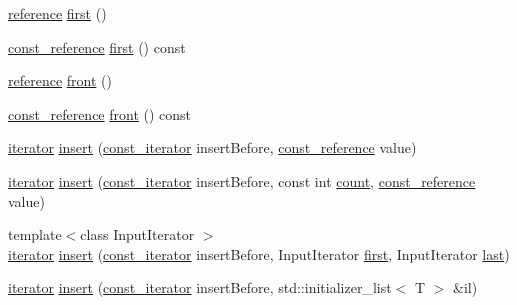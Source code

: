 \begin{DoxyCompactItemize}
\item 
\hyperlink{classprism_1_1_list_a87113fe9cf2580e395e3d9f2962f4e81}{reference} \hyperlink{classprism_1_1_list_a403997c37906888fb96e612557fc7a05}{first} ()
\item 
\hyperlink{classprism_1_1_list_aa263682b12cb5ca200c1b30f85fac524}{const\+\_\+reference} \hyperlink{classprism_1_1_list_a40d014004df46b9997ce81bbc490dac0}{first} () const 
\item 
\hyperlink{classprism_1_1_list_a87113fe9cf2580e395e3d9f2962f4e81}{reference} \hyperlink{classprism_1_1_list_a389a92c786597aa0fc0918189491cd64}{front} ()
\item 
\hyperlink{classprism_1_1_list_aa263682b12cb5ca200c1b30f85fac524}{const\+\_\+reference} \hyperlink{classprism_1_1_list_a3082476c9130719533c961b46e09762d}{front} () const 
\item 
\hyperlink{classprism_1_1_list_a32f6b5634a5aabc496ccb652eb22c490}{iterator} \hyperlink{classprism_1_1_list_a313a60ae219854247f2dfa464ac30b8e}{insert} (\hyperlink{classprism_1_1_list_aafd1fe9c849b0369c3bf7bb0d456e0a3}{const\+\_\+iterator} insert\+Before, \hyperlink{classprism_1_1_list_aa263682b12cb5ca200c1b30f85fac524}{const\+\_\+reference} value)
\item 
\hyperlink{classprism_1_1_list_a32f6b5634a5aabc496ccb652eb22c490}{iterator} \hyperlink{classprism_1_1_list_ab92c8e2076807ea6ecc2fce099e6a3e7}{insert} (\hyperlink{classprism_1_1_list_aafd1fe9c849b0369c3bf7bb0d456e0a3}{const\+\_\+iterator} insert\+Before, const int \hyperlink{classprism_1_1_list_a7dbdab274aecfdc26b7d208f80772a78}{count}, \hyperlink{classprism_1_1_list_aa263682b12cb5ca200c1b30f85fac524}{const\+\_\+reference} value)
\item 
{\footnotesize template$<$class Input\+Iterator $>$ }\\\hyperlink{classprism_1_1_list_a32f6b5634a5aabc496ccb652eb22c490}{iterator} \hyperlink{classprism_1_1_list_a79c26970ac36446b3b9321ee55d869a1}{insert} (\hyperlink{classprism_1_1_list_aafd1fe9c849b0369c3bf7bb0d456e0a3}{const\+\_\+iterator} insert\+Before, Input\+Iterator \hyperlink{classprism_1_1_list_a403997c37906888fb96e612557fc7a05}{first}, Input\+Iterator \hyperlink{classprism_1_1_list_a674a1f2acb2580b63ec54964334721dd}{last})
\item 
\hyperlink{classprism_1_1_list_a32f6b5634a5aabc496ccb652eb22c490}{iterator} \hyperlink{classprism_1_1_list_a1548ebff73252fd1fb2663320ebddf8a}{insert} (\hyperlink{classprism_1_1_list_aafd1fe9c849b0369c3bf7bb0d456e0a3}{const\+\_\+iterator} insert\+Before, std\+::initializer\+\_\+list$<$ T $>$ \&il)

\end{DoxyCompactItemize}

